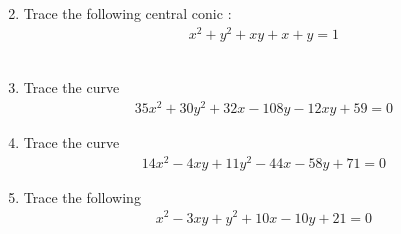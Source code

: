 \begin{enumerate}[label=\thesubsection.\arabic*.,ref=\thesubsection.\theenumi]
\begin{align}
\end{align}
%
\\
\solution

\item Trace the following central conic : 
\begin{align}
    x^2+y^2+xy+x+y=1\label{eq:solutions/41/18/eq:0}
\end{align}
%
\\
\solution

\item Trace the curve
\begin{align}
35x^2+30y^2+32x-108y-12xy+59=0 \label{eq:solutions/41/ex/given_curve_eq}
\end{align}
%
\solution

\item Trace the curve
\begin{align}
14x^2 - 4xy + 11y^2 - 44x - 58y + 71 =0  \label{eq:solutions/41/ex1/given_curve_eq}
\end{align}

\solution

\item Trace the following 
\begin{align}
    x^2-3xy+y^2+10x-10y+21=0 \label{eq:solutions/41/ex2/eq 1}
\end{align}
%
\solution


\end{enumerate}
